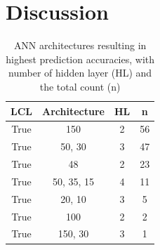 \section{Discussion}

\onehalfspacing
\begin{table}[H]
  \centering
  \caption[ANN architectures of ANN resulting in highest prediction accuracies]{ANN architectures resulting in highest prediction accuracies, with number of hidden layer (HL) and the total count (n)}
  \begin{tabular}{cccc}
  \toprule
    LCL & Architecture & HL & n \\ 
   \midrule
    True &  150        & 2 &  56  \\ 
    True &  50, 30     & 3 &  47  \\ 
    True &  48         & 2 &  23  \\ 
    True &  50, 35, 15 & 4 &  11  \\ 
    True &  20, 10     & 3 &   5  \\ 
    True &  100        & 2 &   2  \\ 
    True &  150, 30    & 3 &   1  \\ 
   \bottomrule
\end{tabular}
\end{table}
\doublespacing
